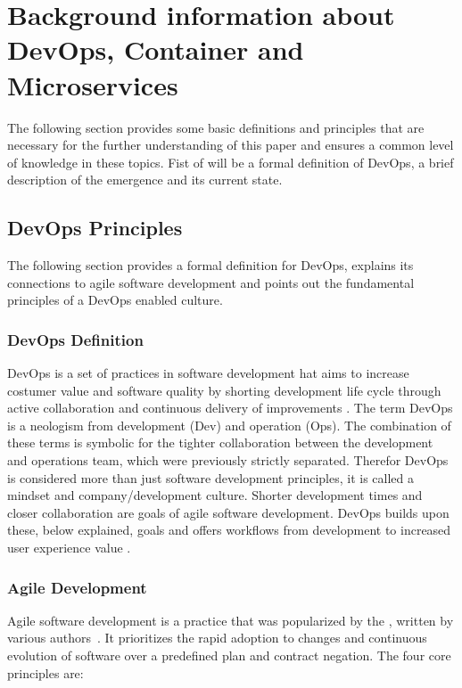 \documentclass[12pt, a4paper]{article}
\begin{document}
\section{Background information about DevOps, Container and Microservices}
The following section provides some basic definitions and principles that are necessary for the further understanding of this paper and ensures a common level of knowledge in these topics.\newline
Fist of will be a formal definition of DevOps, a brief description of the emergence and its current state.
    \subsection{DevOps Principles}
    The following section provides a formal definition for DevOps, explains its connections to agile software development and points out the fundamental principles of a DevOps enabled culture.
        \subsubsection{DevOps Definition}
        DevOps is a set of practices in software development hat aims to increase costumer value and software quality by shorting development life cycle through active collaboration and continuous delivery of improvements \cite{base_devops}. The term DevOps is a neologism from development (Dev) and operation (Ops). The combination of these terms is symbolic for the tighter collaboration between the development and operations team, which were previously strictly separated. Therefor DevOps is considered more than just software development principles, it is called a mindset and company/development culture. Shorter development times and closer collaboration are goals of agile software development. DevOps builds upon these, below explained, goals and offers workflows from development to increased user experience value \cite{azuredevops}.
        \subsubsection{Agile Development}
        Agile software development is a practice that was popularized by the , written by various authors~\cite{manifesto}. It prioritizes the rapid adoption to changes and continuous evolution of software over a predefined plan and contract negation.
        The four core principles are:
\end{document}

